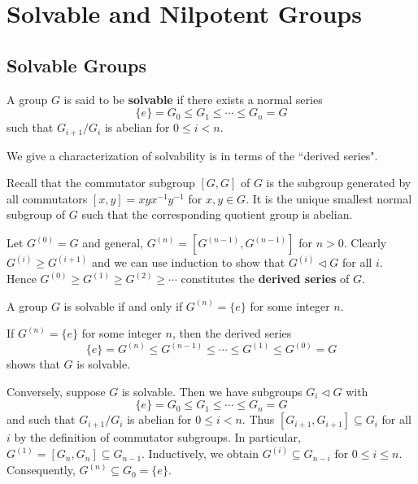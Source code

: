 \section{Solvable and Nilpotent Groups}
\subsection{Solvable Groups}
\begin{definition}
	A group $G$ is said to be \textbf{solvable} if there exists a normal series
	\begin{equation*}
		\{e\} = G_0 \leq G_1 \leq \cdots \leq G_n = G
	\end{equation*}
	such that $
		G_{i+1}/G_{i}$ is abelian
	for $0\leq i<n$.
\end{definition}


We give a characterization of solvability is in terms of the ``derived series".  

Recall that the commutator subgroup $[G,G]$ of $G$ is the subgroup generated by all commutators $[x, y] = xy  x^{-1} y^{-1}$ for $x, y \in G$. It is the unique smallest normal subgroup of $G$ such that the corresponding quotient group is abelian.

Let  $G^{(0)} = G$ and  general, $G^{(n)} = [G^{(n-1)},G^{(n-1)}]$ for $n > 0$. Clearly $G^{(i)} \geq G^{(i+1)}$ and we can use induction to show that $G^{(i)}\lhd G$ for all $i$. Hence $G^{(0)} \geq G^{(1)} \geq G^{(2)} \geq \cdots$ constitutes the \textbf{derived series}  of $G$.

\begin{theorem} \label{thm-solvable}
	A group $G$ is solvable if and only if  $G^{(n)} = \{e\}$ for some integer $n$.
\end{theorem}
\begin{sketch}
	If $G^{(n)} = \{e\}$ for some integer $n$, then the derived series
	$$\{e\} = G^{(n)} \leq G^{(n-1)} \leq \cdots \leq G^{(1)} \leq G^{(0)} = G$$
	shows that $G$ is solvable.
	
	Conversely, suppose $G$ is solvable. Then we have subgroups $G_i \lhd G$ with
	$$\{e\} = G_0 \leq G_1 \leq\cdots \leq G_n = G$$
	and such that $G_{i+1}/G_i$ is abelian for $0 \leq i < n$. Thus $[G_{i+1},G_{i+1}] \subseteq G_i$ for all $i$ by the definition of commutator subgroups. In particular, $G^{(1)} = [G_n,G_n] \subseteq G_{n-1}$. Inductively, we obtain $G^{(i)} \subseteq G_{n-i}$ for $0 \leq i \leq n$. Consequently, $G^{(n)} \subseteq G_0 = \{e\}$.
\end{sketch}

